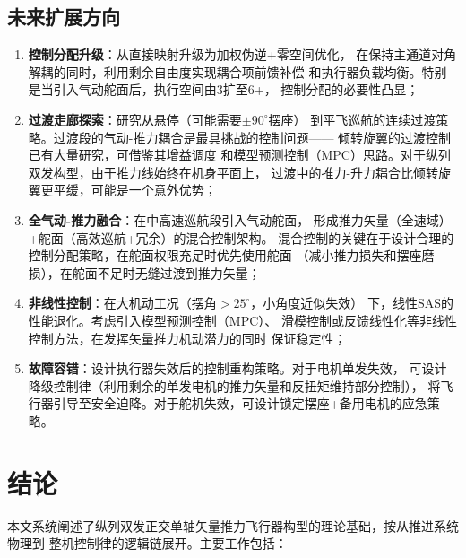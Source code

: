 \documentclass[a4paper,12pt]{ctexart}
\theoremstyle{plain}
\theoremstyle{definition}
\begin{document}
\subsection{未来扩展方向}

\begin{enumerate}[label=(\arabic*)]
    \item \textbf{控制分配升级}：从直接映射升级为加权伪逆+零空间优化，
          在保持主通道对角解耦的同时，利用剩余自由度实现耦合项前馈补偿
          和执行器负载均衡。特别是当引入气动舵面后，执行空间由3扩至6+，
          控制分配的必要性凸显；
    \item \textbf{过渡走廊探索}：研究从悬停（可能需要$\pm 90^\circ$摆座）
          到平飞巡航的连续过渡策略。过渡段的气动-推力耦合是最具挑战的控制问题——
          倾转旋翼的过渡控制已有大量研究\cite{kang2009control}，可借鉴其增益调度
          和模型预测控制（MPC）思路。对于纵列双发构型，由于推力线始终在机身平面上，
          过渡中的推力-升力耦合比倾转旋翼更平缓，可能是一个意外优势；
    \item \textbf{全气动-推力融合}：在中高速巡航段引入气动舵面，
          形成推力矢量（全速域）+舵面（高效巡航+冗余）的混合控制架构。
          混合控制的关键在于设计合理的控制分配策略，在舵面权限充足时优先使用舵面
          （减小推力损失和摆座磨损），在舵面不足时无缝过渡到推力矢量；
    \item \textbf{非线性控制}：在大机动工况（摆角$>25^\circ$，小角度近似失效）
          下，线性SAS的性能退化。考虑引入模型预测控制（MPC）、
          滑模控制或反馈线性化等非线性控制方法，在发挥矢量推力机动潜力的同时
          保证稳定性；
    \item \textbf{故障容错}：设计执行器失效后的控制重构策略。对于电机单发失效，
          可设计降级控制律（利用剩余的单发电机的推力矢量和反扭矩维持部分控制），
          将飞行器引导至安全迫降。对于舵机失效，可设计锁定摆座+备用电机的应急策略。
\end{enumerate}

\section{结论}
\label{sec:conclusion}

本文系统阐述了纵列双发正交单轴矢量推力飞行器构型的理论基础，按从推进系统物理到
整机控制律的逻辑链展开。主要工作包括：
\end{document}
